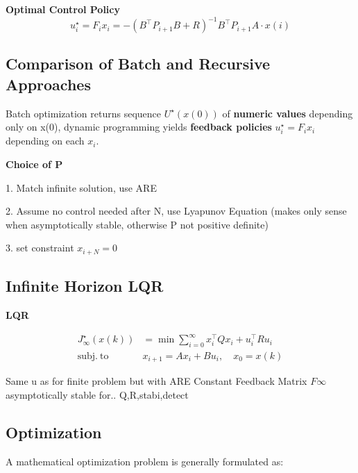 \textbf{Optimal Control Policy}
\[
	u_i^\star = F_i x_i =
	-(B^\top P_{i+1}B + R)^{-1}
	B^\top P_{i+1} A \cdot x(i)
\]

\subsection{Comparison of Batch and Recursive Approaches}

Batch optimization returns sequence $U^\star(x(0))$
of \textbf{numeric values} depending only on x(0),
dynamic programming yields \textbf{feedback policies}
$u_i^\star = F_i x_i$ depending on each $x_i$.

\textbf{Choice of P}

1. Match infinite solution, use ARE

2. Assume no control needed after N, use Lyapunov Equation %
(makes only sense when asymptotically stable, otherwise P not positive definite)

3. set constraint $x_{i+N}=0$

\subsection{Infinite Horizon LQR}
\begin{sstTitleBox}[ForestGreen]{\center\textbf{\large
			LQR
		}
	}

	\[ \begin{aligned}
			J_\infty^\star(x(k))  & = \min \sum_{i=0}^\infty
			x_i^\top Q x_i + u_i^\top R u_i                                   \\
			\mathrm{subj.\ to }\  & x_{i+1} = Ax_i + Bu_i,\quad    x_0 = x(k)
		\end{aligned} \]

	Same u as for finite problem but with ARE
	Constant  Feedback Matrix $F\infty$
	asymptotically stable for.. Q,R,stabi,detect


\end{sstTitleBox}

\subsection{Optimization}

A mathematical optimization problem is generally formulated as:

